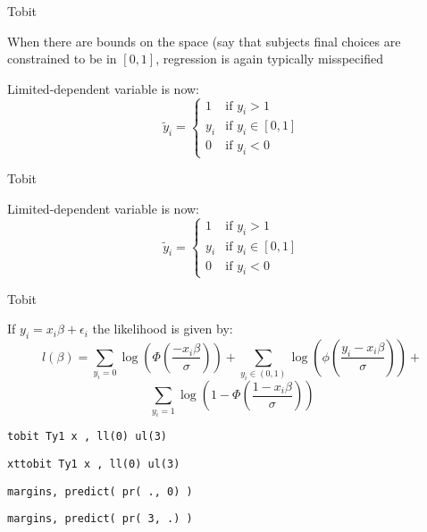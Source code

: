 \documentclass{beamer}
\begin{document}
\begin{frame}{Tobit}
	\begin{card}
	When there are bounds on the space (say that subjects final choices are constrained to be in $[0,1]$, regression is again typically misspecified\end{card}
	
	\begin{card} Limited-dependent variable is now:
				$$\tilde{y}_i=\begin{cases} 1 & \text{if $y_i>1$} \\ y_i & \text{if $y_i\in[0,1]$} \\ 0 & \text{if $y_i<0$}  \end{cases} $$\end{card}
				
\end{frame}

\begin{frame}{Tobit}

	\begin{card} Limited-dependent variable is now:
				$$\tilde{y}_i=\begin{cases} 1 & \text{if $y_i>1$} \\ y_i & \text{if $y_i\in[0,1]$} \\ 0 & \text{if $y_i<0$}  \end{cases} $$\end{card}
				
\end{frame}

\begin{frame}{Tobit}

				
		\begin{card}If $y_i=x_i\beta +\epsilon_i$ the likelihood is given by:
		$$ l(\beta)=\sum_{y_i=0} \log\left(\Phi(\frac{-x_i\beta}{\sigma})\right)+ \sum_{y_i\in(0,1)} \log\left(\phi(\frac{y_i-x_i\beta}{\sigma})\right)+$$ $$\sum_{y_i=1} \log\left(1-\Phi(\frac{1-x_i\beta}{\sigma})\right)$$
	\end{card}
\end{frame}

\begin{frame}
    \begin{card}[STATA]
        \texttt{tobit Ty1 x , ll(0) ul(3)}
        
        \texttt{xttobit Ty1 x , ll(0) ul(3)}
        
        \texttt{margins, predict( pr( ., 0) )}
        
        \texttt{margins, predict( pr( 3, .) )}
    \end{card}
\end{frame}
\end{document}
